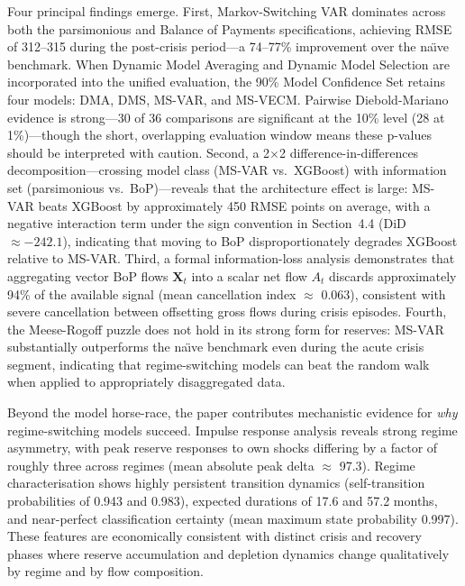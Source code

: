 \documentclass[12pt,a4paper]{article}
\begin{document}
Four principal findings emerge. First, Markov-Switching VAR dominates across both the parsimonious and Balance of Payments specifications, achieving RMSE of 312--315 during the post-crisis period---a 74--77\% improvement over the na\"{\i}ve benchmark. When Dynamic Model Averaging and Dynamic Model Selection are incorporated into the unified evaluation, the 90\% Model Confidence Set retains four models: DMA, DMS, MS-VAR, and MS-VECM. Pairwise Diebold-Mariano evidence is strong---30 of 36 comparisons are significant at the 10\% level (28 at 1\%)---though the short, overlapping evaluation window means these p-values should be interpreted with caution. Second, a 2$\times$2 difference-in-differences decomposition---crossing model class (MS-VAR vs.\ XGBoost) with information set (parsimonious vs.\ BoP)---reveals that the architecture effect is large: MS-VAR beats XGBoost by approximately 450 RMSE points on average, with a negative interaction term under the sign convention in Section~4.4 (DiD $\approx -242.1$), indicating that moving to BoP disproportionately degrades XGBoost relative to MS-VAR. Third, a formal information-loss analysis demonstrates that aggregating vector BoP flows $\mathbf{X}_t$ into a scalar net flow $A_t$ discards approximately 94\% of the available signal (mean cancellation index $\approx$ 0.063), consistent with severe cancellation between offsetting gross flows during crisis episodes. Fourth, the Meese-Rogoff puzzle does not hold in its strong form for reserves: MS-VAR substantially outperforms the na\"{\i}ve benchmark even during the acute crisis segment, indicating that regime-switching models can beat the random walk when applied to appropriately disaggregated data.

Beyond the model horse-race, the paper contributes mechanistic evidence for \textit{why} regime-switching models succeed. Impulse response analysis reveals strong regime asymmetry, with peak reserve responses to own shocks differing by a factor of roughly three across regimes (mean absolute peak delta $\approx$ 97.3). Regime characterisation shows highly persistent transition dynamics (self-transition probabilities of 0.943 and 0.983), expected durations of 17.6 and 57.2 months, and near-perfect classification certainty (mean maximum state probability 0.997). These features are economically consistent with distinct crisis and recovery phases where reserve accumulation and depletion dynamics change qualitatively by regime and by flow composition.
\end{document}
